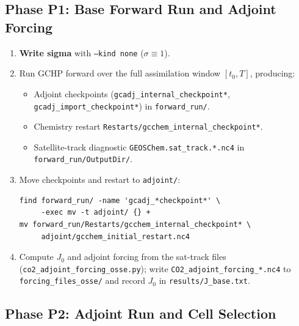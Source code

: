 \documentclass[12pt]{article}
\begin{document}
\subsection{Phase P1: Base Forward Run and Adjoint Forcing}

\begin{enumerate}
  \item \textbf{Write sigma} with \texttt{--kind none} ($\sigma \equiv 1$).
  \item Run GCHP forward over the full assimilation window
        $[t_0, T]$, producing:
        \begin{itemize}
          \item Adjoint checkpoints (\texttt{gcadj\_internal\_checkpoint*},
                \texttt{gcadj\_import\_checkpoint*}) in \texttt{forward\_run/}.
          \item Chemistry restart
                \texttt{Restarts/gcchem\_internal\_checkpoint*}.
          \item Satellite-track diagnostic \texttt{GEOSChem.sat\_track.*.nc4}
                in \texttt{forward\_run/OutputDir/}.
        \end{itemize}
  \item Move checkpoints and restart to \texttt{adjoint/}:
        \begin{lstlisting}
find forward_run/ -name 'gcadj_*checkpoint*' \
     -exec mv -t adjoint/ {} +
mv forward_run/Restarts/gcchem_internal_checkpoint* \
     adjoint/gcchem_initial_restart.nc4
        \end{lstlisting}
  \item Compute $J_0$ and adjoint forcing from the sat-track files
        (\texttt{co2\_adjoint\_forcing\_osse.py}); write
        \texttt{CO2\_adjoint\_forcing\_*.nc4} to \texttt{forcing\_files\_osse/}
        and record $J_0$ in \texttt{results/J\_base.txt}.
\end{enumerate}

\subsection{Phase P2: Adjoint Run and Cell Selection}
\end{document}
